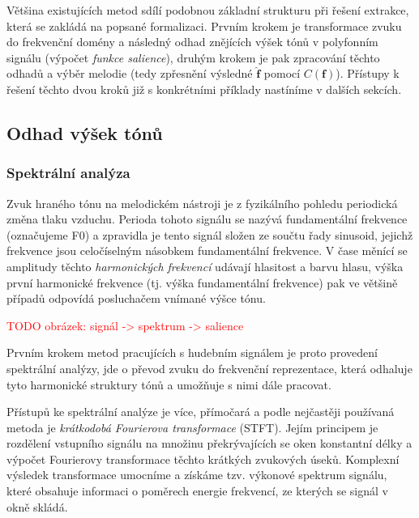 Většina existujících metod sdílí podobnou základní strukturu při řešení extrakce, která se zakládá na popsané formalizaci. Prvním krokem je transformace zvuku do frekvenční domény a následný odhad znějících výšek tónů v polyfonním signálu (výpočet \emph{funkce salience}), druhým krokem je pak zpracování těchto odhadů a výběr melodie (tedy zpřesnění výsledné $\hat{\mathbf{f}}$ pomocí $C(\mathbf{f})$). Přístupy k řešení těchto dvou kroků již s konkrétními příklady nastíníme v dalších sekcích.

\subsection{Odhad výšek tónů}

\subsubsection{Spektrální analýza}

Zvuk hraného tónu na melodickém nástroji je z fyzikálního pohledu periodická změna tlaku vzduchu. Perioda tohoto signálu se nazývá fundamentální frekvence (označujeme F0) a zpravidla je tento signál složen ze součtu řady sinusoid, jejichž frekvence jsou celočíselným násobkem fundamentální frekvence. V čase měnící se amplitudy těchto \emph{harmonických frekvencí} udávají hlasitost a barvu hlasu, výška první harmonické frekvence (tj. výška fundamentální frekvence) pak ve většině případů odpovídá posluchačem vnímané výšce tónu. 

\textcolor{red}{TODO obrázek: signál -> spektrum -> salience}

Prvním krokem metod pracujících s hudebním signálem je proto provedení spektrální analýzy, jde o převod zvuku do frekvenční reprezentace, která odhaluje tyto harmonické struktury tónů a umožňuje s nimi dále pracovat. 


Přístupů ke spektrální analýze je více, přímočará a podle \cite{Dressler2016} nejčastěji používaná metoda je \emph{krátkodobá Fourierova transformace} (STFT). Jejím principem je rozdělení vstupního signálu na množinu překrývajících se oken konstantní délky a výpočet Fourierovy transformace těchto krátkých zvukových úseků. Komplexní výsledek transformace umocníme a získáme tzv. výkonové spektrum signálu, které obsahuje informaci o poměrech energie frekvencí, ze kterých se signál v okně skládá. 

